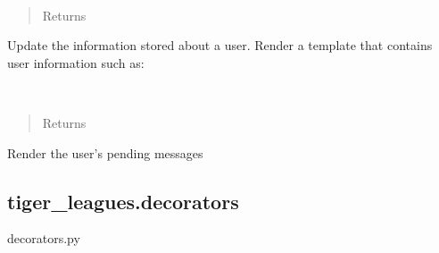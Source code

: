 \documentclass[letterpaper,10pt,english]{sphinxmanual}
\begin{document}
\begin{fulllineitems}
\label{\detokenize{tiger_leagues/readme:tiger_leagues.user.update_user_profile}}~\begin{quote}\begin{description}
\item[{Returns}] \leavevmode
{}

\end{description}\end{quote}

Update the information stored about a user. Render a template that contains 
user information such as: 

\end{fulllineitems}


\begin{fulllineitems}
\label{\detokenize{tiger_leagues/readme:tiger_leagues.user.view_notifications}}~\begin{quote}\begin{description}
\item[{Returns}] \leavevmode
{}

\end{description}\end{quote}

Render the user’s pending messages

\end{fulllineitems}



\subsection{tiger\_leagues.decorators}
\label{\detokenize{tiger_leagues/readme:module-tiger_leagues.decorators}}\label{\detokenize{tiger_leagues/readme:tiger-leagues-decorators}}
decorators.py
\end{document}
